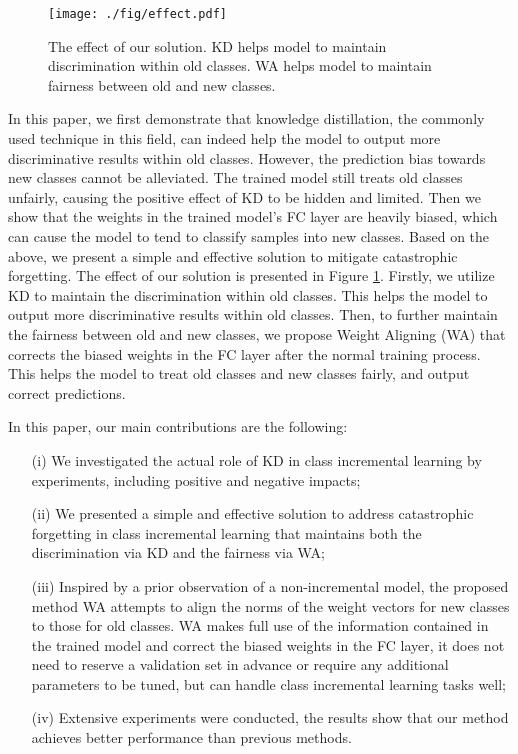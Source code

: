 \documentclass[10pt,twocolumn,letterpaper]{article}
\begin{document}
\begin{figure}[t]
  \centering
  \texttt{[image: ./fig/effect.pdf]}
  \caption{The effect of our solution. KD helps model to maintain discrimination within old classes. WA helps model to maintain fairness between old and new classes.}
  \label{fig:effect}
\end{figure}

In this paper, we first demonstrate that knowledge distillation, the commonly used technique in this field, can indeed help the model to output more discriminative results within old classes. However, the prediction bias towards new classes cannot be alleviated. The trained model still treats old classes unfairly, causing the positive effect of KD to be hidden and limited. Then we show that the weights in the trained model's FC layer are heavily biased, which can cause the model to tend to classify samples into new classes. Based on the above, we present a simple and effective solution to mitigate catastrophic forgetting. The effect of our solution is presented in Figure \ref{fig:effect}. Firstly, we utilize KD to maintain the discrimination within old classes. This helps the model to output more discriminative results within old classes. Then, to further maintain the fairness between old and new classes, we propose Weight Aligning (WA) that corrects the biased weights in the FC layer after the normal training process. This helps the model to treat old classes and new classes fairly, and output correct predictions.

In this paper, our main contributions are the following: 
\begin{itemize}[noitemsep]
  \item[(i)] We investigated the actual role of KD in class incremental learning by experiments, including positive and negative impacts; 
  \item[(ii)] We presented a simple and effective solution to address catastrophic forgetting in class incremental learning that maintains both the discrimination via KD and the fairness via WA; 
  \item[(iii)] Inspired by a prior observation of a non-incremental model, the proposed method WA attempts to align the norms of the weight vectors for new classes to those for old classes. WA makes full use of the information contained in the trained model and correct the biased weights in the FC layer, it does not need to reserve a validation set in advance or require any additional parameters to be tuned, but can handle class incremental learning tasks well; 
  \item[(iv)] Extensive experiments were conducted, the results show that our method achieves better performance than previous methods.  
\end{itemize}
\end{document}
